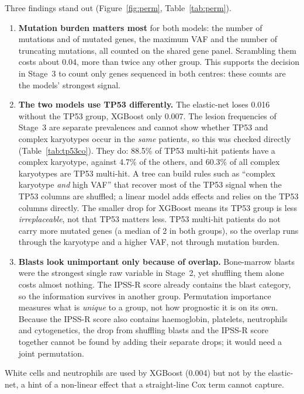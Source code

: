 \documentclass[11pt,a4paper]{article}
\begin{document}
Three findings stand out (Figure~\ref{fig:perm}, Table~\ref{tab:perm}).
\begin{enumerate}
  \item \textbf{Mutation burden matters most} for both models: the number of mutations and
        of mutated genes, the maximum VAF and the number of truncating mutations, all
        counted on the shared gene panel. Scrambling them costs about 0.04, more than twice
        any other group. This supports the decision in Stage~3 to count only genes
        sequenced in both centres: these counts are the models' strongest signal.
  \item \textbf{The two models use TP53 differently.} The elastic-net loses 0.016 without
        the TP53 group, XGBoost only 0.007. The lesion frequencies of Stage~3 are separate
        prevalences and cannot show whether TP53 and complex karyotypes occur in the
        \emph{same} patients, so this was checked directly (Table~\ref{tab:tp53co}). They
        do: 88.5\% of TP53 multi-hit patients have a complex karyotype, against 4.7\% of
        the others, and 60.3\% of all complex karyotypes are TP53 multi-hit. A tree can
        build rules such as ``complex karyotype \emph{and} high VAF'' that recover most of
        the TP53 signal when the TP53 columns are shuffled; a linear model adds effects and
        relies on the TP53 columns directly. The smaller drop for XGBoost means its TP53
        group is less \emph{irreplaceable}, not that TP53 matters less. TP53 multi-hit
        patients do not carry more mutated genes (a median of 2 in both groups), so the
        overlap runs through the karyotype and a higher VAF, not through mutation burden.
  \item \textbf{Blasts look unimportant only because of overlap.} Bone-marrow blasts were
        the strongest single raw variable in Stage~2, yet shuffling them alone costs
        almost nothing. The IPSS-R score already contains the blast category, so the
        information survives in another group. Permutation importance measures what is
        \emph{unique} to a group, not how prognostic it is on its own. Because the IPSS-R
        score also contains haemoglobin, platelets, neutrophils and cytogenetics, the drop
        from shuffling blasts and the IPSS-R score together cannot be found by adding
        their separate drops; it would need a joint permutation.
\end{enumerate}
White cells and neutrophils are used by XGBoost (0.004) but not by the elastic-net, a hint
of a non-linear effect that a straight-line Cox term cannot capture.
\end{document}
